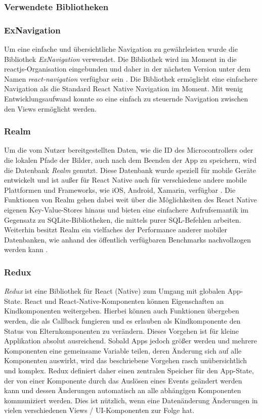         \subsubsection{Verwendete Bibliotheken}
        
        \subsubsection*{ExNavigation}
Um eine einfache und übersichtliche  Navigation zu gewährleisten wurde die Bibliothek \textit{ExNavigation} verwendet. Die Bibliothek wird im Moment in die reactjs-Organisation eingebunden und daher in der nächsten Version unter dem Namen \textit{react-navigation} verfügbar sein \cite{Vatne_exnavigation_2017}. Die Bibliothek ermöglicht eine einfachere Navigation als die Standard React Native Navigation im Moment. Mit wenig Entwicklungsaufwand konnte so eine einfach zu steuernde Navigation zwischen den Views ermöglicht werden.

        \subsubsection*{Realm}
        Um die vom Nutzer bereitgestellten Daten, wie die ID des Microcontrollers oder die lokalen Pfade der Bilder, auch nach dem Beenden der App zu speichern, wird die Datenbank \textit{Realm} genutzt. Diese Datenbank wurde speziell für mobile Geräte entwickelt und ist außer für React Native auch für verschiedene andere mobile Plattformen und Frameworks, wie iOS, Android, Xamarin, verfügbar \cite{Realm_2016}. Die Funktionen von Realm gehen dabei weit über die Möglichkeiten des React Native eigenen Key-Value-Stores hinaus und bieten eine einfachere Aufrufsemantik im Gegensatz zu SQLite-Bibliotheken, die mittels purer SQL-Befehlen arbeiten.
        Weiterhin besitzt Realm ein vielfaches der Performance anderer mobiler Datenbanken, wie anhand des öffentlich verfügbaren Benchmarks nachvollzogen werden kann \cite{Realm_Benchmark_2016}.
        
        \subsubsection*{Redux}
        \textit{Redux} ist eine Bibliothek für React (Native) zum Umgang mit globalen App-State. React und React-Native-Komponenten können Eigenschaften an Kindkomponenten weitergeben. Hierbei können auch Funktionen übergeben werden, die als Callback fungieren und es erlauben als Kindkomponente den Status von Elternkomponenten zu verändern. Dieses Vorgehen ist für kleine Applikation absolut ausreichend. Sobald Apps jedoch größer werden und mehrere Komponenten eine gemeinsame Variable teilen, deren Änderung sich auf alle Komponenten auswirkt, wird das beschriebene Vorgehen rasch unübersichtlich und komplex. Redux definiert daher einen zentralen Speicher für den App-State, der von einer Komponente durch das Auslösen eines Events geändert werden kann und dessen Änderungen automatisch an alle abhängigen Komponenten kommuniziert werden. Dies ist nützlich, wenn eine Datenänderung Änderungen in vielen verschiedenen Views / UI-Komponenten zur Folge hat.
        
